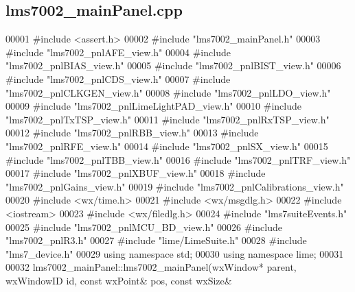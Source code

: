 \subsection{lms7002\+\_\+main\+Panel.\+cpp}
\label{lms7002__mainPanel_8cpp_source}

\begin{DoxyCode}
00001 \textcolor{preprocessor}{#include <assert.h>}
00002 \textcolor{preprocessor}{#include "lms7002_mainPanel.h"}
00003 \textcolor{preprocessor}{#include "lms7002_pnlAFE_view.h"}
00004 \textcolor{preprocessor}{#include "lms7002_pnlBIAS_view.h"}
00005 \textcolor{preprocessor}{#include "lms7002_pnlBIST_view.h"}
00006 \textcolor{preprocessor}{#include "lms7002_pnlCDS_view.h"}
00007 \textcolor{preprocessor}{#include "lms7002_pnlCLKGEN_view.h"}
00008 \textcolor{preprocessor}{#include "lms7002_pnlLDO_view.h"}
00009 \textcolor{preprocessor}{#include "lms7002_pnlLimeLightPAD_view.h"}
00010 \textcolor{preprocessor}{#include "lms7002_pnlTxTSP_view.h"}
00011 \textcolor{preprocessor}{#include "lms7002_pnlRxTSP_view.h"}
00012 \textcolor{preprocessor}{#include "lms7002_pnlRBB_view.h"}
00013 \textcolor{preprocessor}{#include "lms7002_pnlRFE_view.h"}
00014 \textcolor{preprocessor}{#include "lms7002_pnlSX_view.h"}
00015 \textcolor{preprocessor}{#include "lms7002_pnlTBB_view.h"}
00016 \textcolor{preprocessor}{#include "lms7002_pnlTRF_view.h"}
00017 \textcolor{preprocessor}{#include "lms7002_pnlXBUF_view.h"}
00018 \textcolor{preprocessor}{#include "lms7002_pnlGains_view.h"}
00019 \textcolor{preprocessor}{#include "lms7002_pnlCalibrations_view.h"}
00020 \textcolor{preprocessor}{#include <wx/time.h>}
00021 \textcolor{preprocessor}{#include <wx/msgdlg.h>}
00022 \textcolor{preprocessor}{#include <iostream>}
00023 \textcolor{preprocessor}{#include <wx/filedlg.h>}
00024 \textcolor{preprocessor}{#include "lms7suiteEvents.h"}
00025 \textcolor{preprocessor}{#include "lms7002_pnlMCU_BD_view.h"}
00026 \textcolor{preprocessor}{#include "lms7002_pnlR3.h"}
00027 \textcolor{preprocessor}{#include "lime/LimeSuite.h"}
00028 \textcolor{preprocessor}{#include "lms7_device.h"}
00029 \textcolor{keyword}{using namespace }std;
00030 \textcolor{keyword}{using namespace }lime;
00031 
00032 lms7002_mainPanel::lms7002_mainPanel(wxWindow* parent, wxWindowID \textcolor{keywordtype}{id}, \textcolor{keyword}{const} wxPoint& pos, \textcolor{keyword}{const} wxSize& 

\end{DoxyCode}
